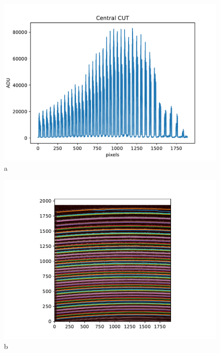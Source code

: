 \begin{figure}

\begin{center}
\begin{minipage}{.495\textwidth}
\begin{center}
\includegraphics[width=\textwidth]{Figures/cal_loc_RAW_spirou_1.pdf}
a
\end{center}
\end{minipage}%
\begin{minipage}{.495\textwidth}
\begin{center}
\includegraphics[width=\textwidth]{Figures/cal_loc_RAW_spirou_2.pdf}
b
\end{center}
\end{minipage}%
\end{center}


\end{figure}
